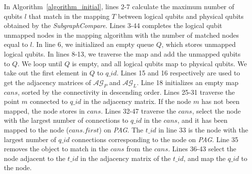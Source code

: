 \documentclass[runningheads]{llncs}
\begin{document}
	In Algorithm~\ref{algorithm_initial}, lines 2-7 calculate the maximum number of qubits $l$ that match in the mapping $T$ between logical qubits and physical qubits obtained by the \textit{SubgraphCompare}. Lines 3-44 completes the logical qubit unmapped nodes in the mapping algorithm with the number of matched nodes equal to $l$. In line 6, we initialized an empty queue $Q$, which stores unmapped logical qubits. In lines 8-13, we traverse the map and add the unmapped qubits to $Q$. We loop until $Q$ is empty, and all logical qubits map to physical qubits. We take out the first element in $Q$ to $q\_id$. Lines 15 and 16 respectively are used to get the adjacency matrices of $\mathcal{AG}_{P}$ and $\mathcal{AG}_{L}$. Line 18 initializes an empty map $cans$, sorted by the connectivity in descending order. Lines 25-31 traverse the point $m$ connected to $q\_id$ in the adjacency matrix. If the node $m$ has not been mapped, the node stores in $cans$. Lines 32-47 traverse the $cans$, select the node with the largest number of connections to $q\_id$ in the $cans$, and it has been mapped to the node ($cans.first$) on \textit{PAG}. The $t\_id$ in line 33 is the node with the largest number of $q\_id$ connections corresponding to the node on \textit{PAG}. Line 35  removes the object to match in the $cans$ from the $cans$. Lines 36-43  select the node adjacent to the $t\_id$ in the adjacency matrix of the $t\_id$, and map the $q\_id$ to the node.
\end{document}
